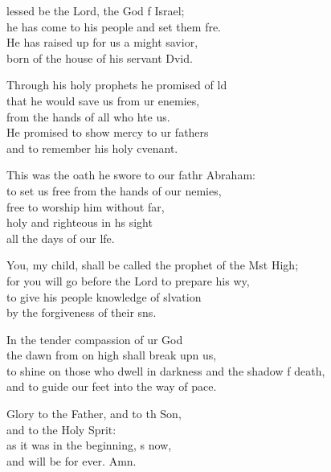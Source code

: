 \begin{psalmverse}
  \begin{patverse}
lessed be the Lord, the God f Israel;\Med\\
he has come to his people and set them fre.\\
He has raised up for us a might savior,\Med\\
born of the house of his servant Dvid.

Through his holy prophets he promised of ld\Flex\\
that he would save us from ur enemies,\Med\\
from the hands of all who hte us.\\
He promised to show mercy to ur fathers\Med\\
and to remember his holy cvenant.

This was the oath he swore to our fathr Abraham:\Med\\
to set us free from the hands of our nemies,\\
free to worship him without far,\Flex\\
holy and righteous in h\pointup{\i}s sight\Med\\
all the days of our l\pointup{\i}fe.

You, my child, shall be called the prophet of the Mst High;\Med\\
for you will go before the Lord to prepare his wy,\\
to give his people knowledge of slvation\Med\\
by the forgiveness of their s\pointup{\i}ns.

In the tender compassion of ur God\Med\\
the dawn from on high shall break upn us,\\
to shine on those who dwell in darkness and the shadow f death,\Med\\
and to guide our feet into the way of pace.

Glory to the Father, and to th Son,\Med\\
and to the Holy Sp\pointup{\i}rit:\\
as it was in the beginning, \pointup{\i}s now,\Med\\
and will be for ever. Amn.
  \end{patverse}
  \end{psalmverse}
